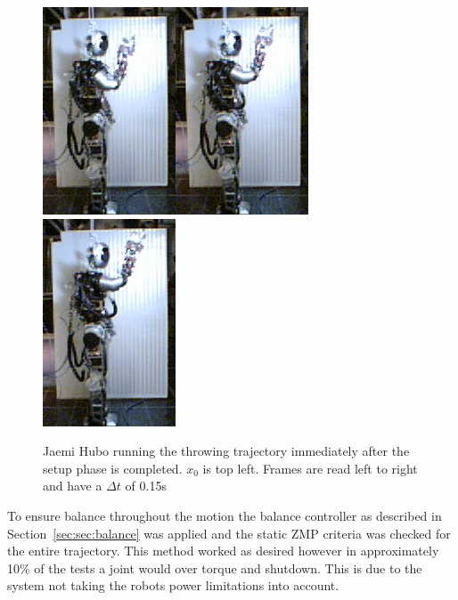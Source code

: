 \begin{figure}[h]
\includegraphics[width=0.25\columnwidth]{./pix/slowMotion/5.png}\includegraphics[width=0.25\columnwidth]{./pix/slowMotion/6.png}\includegraphics[width=0.25\columnwidth]{./pix/slowMotion/7.png}
  \caption{Jaemi Hubo running the throwing trajectory immediately after the setup phase is completed.  $x_0$ is top left.  Frames are read left to right and have a $\Delta t$ of 0.15s\cite{dlofaro-srm}}
  \label{fig:3dThrowReal}
\end{figure}

To ensure balance throughout the motion the balance controller as described in Section~\ref{sec:sec:balance} was applied and the static ZMP criteria was checked for the entire trajectory.
This method worked as desired however in approximately 10\% of the tests a joint would over torque and shutdown.  
This is due to the system not taking the robots power limitations into account. 

